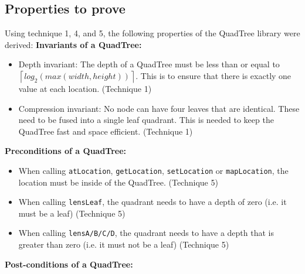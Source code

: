 \subsection{Properties to prove}\label{props_to_prove}
Using technique 1, 4, and 5, the following properties of the QuadTree library were derived: \linebreak 
\textbf{Invariants of a QuadTree:}
\begin{itemize}
    \item Depth invariant: The depth of a QuadTree must be less than or equal to $\left \lceil{log_{2}( max(width, height))}\right \rceil$. This is to ensure that there is exactly one value at each location. (Technique 1)
    \item Compression invariant: No node can have four leaves that are identical. These need to be fused into a single leaf quadrant. This is needed to keep the QuadTree fast and space efficient. (Technique 1)
\end{itemize} 
\textbf{Preconditions of a QuadTree:}
\begin{itemize}
    \item When calling \verb|atLocation|, \verb|getLocation|, \verb|setLocation| or \verb|mapLocation|, the location must be inside of the QuadTree. (Technique 5)
    \item When calling \verb|lensLeaf|, the quadrant needs to have a depth of zero (i.e.  it must be a leaf) (Technique 5)
    \item When calling \verb|lensA/B/C/D|, the quadrant needs to have a depth that is greater than zero (i.e.  it must not be a leaf) (Technique 5)
\end{itemize} 
\textbf{Post-conditions of a QuadTree:}
